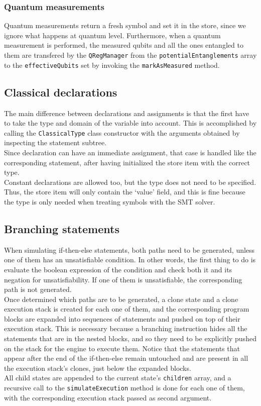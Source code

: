 \documentclass[12pt,a4paper]{report}
\theoremstyle{definition}
\theoremstyle{definition}
\theoremstyle{definition}
\begin{document}
\subsubsection{Quantum measurements}
Quantum measurements return a fresh symbol and set it in the store, since we ignore what happens at quantum level. Furthermore, when a quantum measurement is performed, the measured qubits and all the ones entangled to them are transfered by the \texttt{QRegManager} from the \texttt{potentialEntanglements} array to the \texttt{effectiveQubits} set by invoking the \texttt{markAsMeasured} method.

\subsection{Classical declarations}
The main difference between declarations and assignments is that the first have to take the type and domain of the variable into account. This is accomplished by calling the \texttt{ClassicalType} class constructor with the arguments obtained by inspecting the statement subtree.\\
Since declaration can have an immediate assignment, that case is handled like the corresponding statement, after having initialized the store item with the correct type.\\
Constant declarations are allowed too, but the type does not need to be specified. Thus, the store item will only contain the `value' field, and this is fine because the type is only needed when treating symbols with the SMT solver.

\subsection{Branching statements}
When simulating if-then-else statements, both paths need to be generated, unless one of them has an unsatisfiable condition. In other words, the first thing to do is evaluate the boolean expression of the condition and check both it and its negation for unsatisfiability. If one of them is unsatisfiable, the corresponding path is not generated.\\
Once determined which paths are to be generated, a clone state and a clone execution stack is created for each one of them, and the corresponding program blocks are expanded into sequences of statements and pushed on top of their execution stack. This is necessary because a branching instruction hides all the statements that are in the nested blocks, and so they need to be explicitly pushed on the stack for the engine to execute them. Notice that the statements that appear after the end of the if-then-else remain untouched and are present in all the execution stack's clones, just below the expanded blocks.\\
All child states are appended to the current state's \texttt{children} array, and a recursive call to the \texttt{simulateExecution} method is done for each one of them, with the corresponding execution stack passed as second argument.
\end{document}
